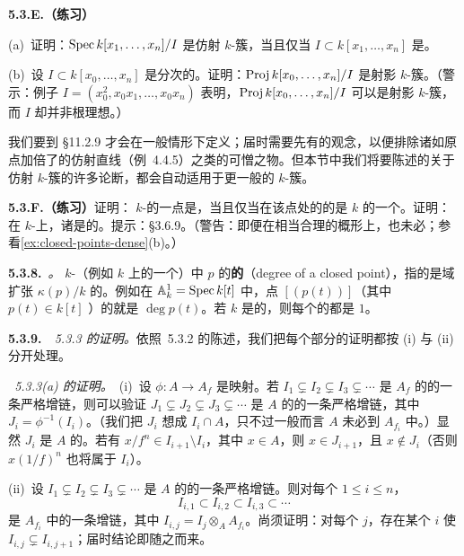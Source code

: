 \textbf{5.3.E.（练习）}

(a)~证明：$\operatorname{Spec} k[x_1,\dots,x_n]/I$ 是仿射 $k$-簇，当且仅当 $I\subset k[x_1,\dots,x_n]$ 是\trRadicalIdeal。

(b)~设 $I\subset k[x_0,\dots,x_n]$ 是分次的\trRadicalIdeal。证明：$\operatorname{Proj} k[x_0,\dots,x_n]/I$ 是射影 $k$-簇。（警示：例子 $I=(x_0^2,x_0x_1,\dots,x_0x_n)$ 表明，$\operatorname{Proj} k[x_0,\dots,x_n]/I$ 可以是射影 $k$-簇，而 $I$ 却并非根理想。）

我们要到 \S11.2.9 才会在一般情形下定义\trVariety；届时需要先有\trSeparatedness{}的观念，以便排除诸如原点加倍了的仿射直线（例~4.4.5）之类的可憎之物。但本节中我们将要陈述的关于仿射 $k$-簇的许多论断，都会自动适用于更一般的 $k$-簇。

\textbf{5.3.F.（练习）}\quad 证明：\trLocally\trFiniteType{} $k$-\trScheme{}的一点是\trClosedPoint，当且仅当\trStructureSheaf{}在该点处的\trStalk{}的\trResidueField{}是 $k$ 的一个\trFiniteFieldExtension。证明：在\trLocally\trFiniteType{} $k$-\trScheme{}上，诸\trClosedPoint{}是\trDense{}的。提示：\S3.6.9。（警告：即便在相当合理的概形上，\trClosedPoint{}也未必\trDense；参看\cref{ex:closed-points-dense}(b)。）

\textbf{5.3.8.}\ \emph{\trhDefinition{}。}\quad \trLocally\trFiniteType{} $k$-\trScheme{}（例如 $k$ 上的一个\trVariety）中\trClosedPoint{} $p$ 的\textbf{\trClosedPoint{}的\trDegree{}}（degree of a closed point），指的是域扩张 $\kappa(p)/k$ 的\trDegree{}。例如在 $\mathbb{A}^1_k=\operatorname{Spec} k[t]$ 中，点 $[(p(t))]$（其中 $p(t)\in k[t]$ \trIrreducible）的\trDegree{}就是 $\deg p(t)$。若 $k$ 是\trAlgClosed{}的，则每个\trClosedPoint{}的\trDegree{}都是 $1$。

\textbf{5.3.9.}\ \emph{\trhProposition{}~5.3.3 的证明。}\quad 依照\trAffineCommunicationLemma{}~5.3.2 的陈述，我们把每个部分的证明都按 (i) 与 (ii) 分开处理。

\emph{\trhProposition{}~5.3.3(a) 的证明。}\ (i)~设 $\phi:A\to A_f$ 是\trLocalization{}映射。若 $I_1\subsetneq I_2\subsetneq I_3\subsetneq\cdots$ 是 $A_f$ 的\trIdeal{}的一条严格增链，则可以验证 $J_1\subsetneq J_2\subsetneq J_3\subsetneq\cdots$ 是 $A$ 的\trIdeal{}的一条严格增链，其中 $J_i=\phi^{-1}(I_i)$。（我们把 $J_i$ 想成 $I_i\cap A$，只不过一般而言 $A$ 未必\trInjectiveMap{}到 $A_{f_i}$ 中。）显然 $J_i$ 是 $A$ 的\trIdeal。若有 $x/f^n\in I_{i+1}\setminus I_i$，其中 $x\in A$，则 $x\in J_{i+1}$，且 $x\notin J_i$（否则 $x(1/f)^n$ 也将属于 $I_i$）。

(ii)~设 $I_1\subsetneq I_2\subsetneq I_3\subsetneq\cdots$ 是 $A$ 的\trIdeal{}的一条严格增链。则对每个 $1\le i\le n$，
\[
I_{i,1}\subset I_{i,2}\subset I_{i,3}\subset\cdots
\]
是 $A_{f_i}$ 中\trIdeal{}的一条增链，其中 $I_{i,j}=I_j\otimes_A A_{f_i}$。尚须证明：对每个 $j$，存在某个 $i$ 使 $I_{i,j}\subsetneq I_{i,j+1}$；届时结论即随之而来。

